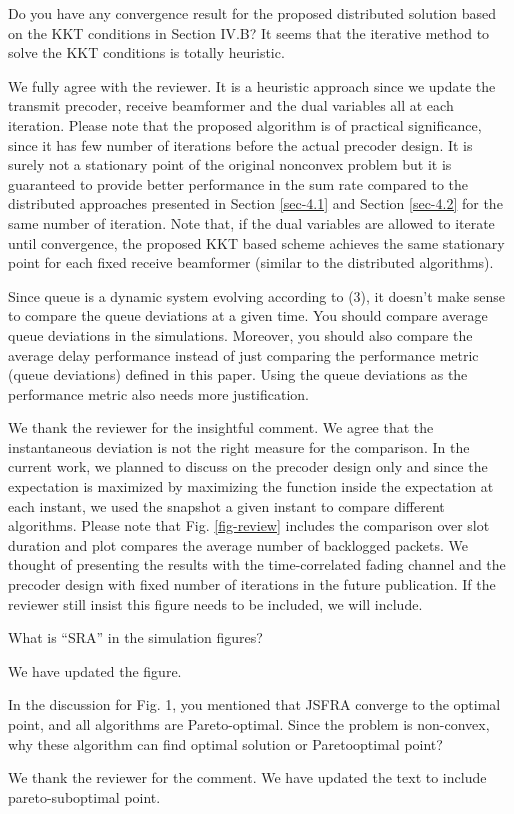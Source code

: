 \begin{itemize}
 Do you have any convergence result for the proposed distributed solution based on the KKT conditions in Section IV.B? It seems that the iterative method to solve the KKT conditions is totally heuristic.

\resp We fully agree with the reviewer. It is a heuristic approach since we update the transmit precoder, receive beamformer and the dual variables all at each iteration. Please note that the proposed algorithm is of practical significance, since it has few number of iterations before the actual precoder design. It is surely not a stationary point of the original nonconvex problem but it is guaranteed to provide better performance in the sum rate compared to the distributed approaches presented in Section \ref{sec-4.1} and Section \ref{sec-4.2} for the same number of iteration. Note that, if the dual variables are allowed to iterate until convergence, the proposed KKT based scheme achieves the same stationary point for each fixed receive beamformer (similar to the distributed algorithms).

 Since queue is a dynamic system evolving according to (3), it doesn’t make sense to compare the queue deviations at a given time. You should compare average queue deviations in the simulations. Moreover, you should also compare the average delay performance instead of just comparing the performance metric (queue deviations) defined in this paper. Using the queue deviations as the performance metric also needs more justification.

\resp We thank the reviewer for the insightful comment. We agree that the instantaneous deviation is not the right measure for the comparison. In the current work, we planned to discuss on the precoder design only and since the expectation is maximized by maximizing the function inside the expectation at each instant, we used the snapshot a given instant to compare different algorithms. Please note that Fig. \ref{fig-review} includes the comparison over  slot duration and plot compares the average number of backlogged packets. We thought of presenting the results with the time-correlated fading channel and the precoder design with fixed number of iterations in the future publication. If the reviewer still insist this figure needs to be included, we will include.

 What is “SRA” in the simulation figures?

\resp We have updated the figure.

 In the discussion for Fig. 1, you mentioned that JSFRA converge to the optimal point, and all algorithms are Pareto-optimal. Since the problem is non-convex, why these algorithm can find optimal solution or Paretooptimal point? 

\resp We thank the reviewer for the comment. We have updated the text to include pareto-suboptimal point.

\end{itemize}

